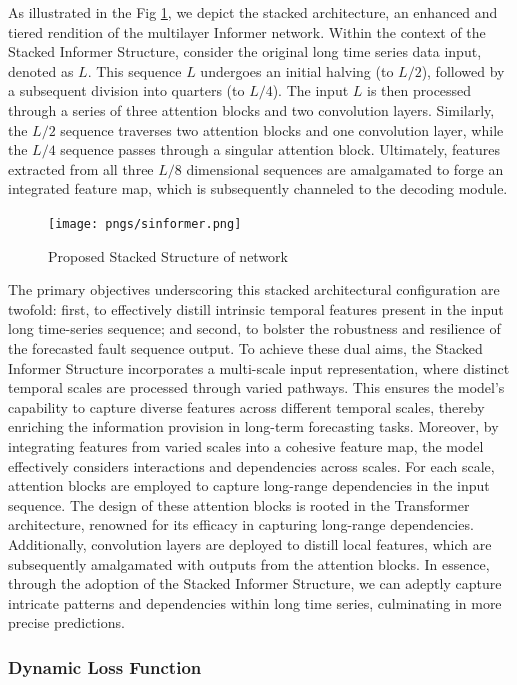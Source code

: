 \documentclass[sn-mathphys,Numbered]{sn-jnl}
\theoremstyle{thmstyleone}%
\theoremstyle{thmstyletwo}%
\theoremstyle{thmstylethree}%
\begin{document}
As illustrated in the Fig \ref{sinformer}, we depict the stacked architecture, an enhanced and tiered rendition of the multilayer Informer network. Within the context of the Stacked Informer Structure, consider the original long time series data input, denoted as \( L \). This sequence \( L \) undergoes an initial halving (to \( L/2 \)), followed by a subsequent division into quarters (to \( L/4 \)). The input \( L \) is then processed through a series of three attention blocks and two convolution layers. Similarly, the \( L/2 \) sequence traverses two attention blocks and one convolution layer, while the \( L/4 \) sequence passes through a singular attention block. Ultimately, features extracted from all three \( L/8 \) dimensional sequences are amalgamated to forge an integrated feature map, which is subsequently channeled to the decoding module.
\begin{figure}[h]
    \centering
    \texttt{[image: pngs/sinformer.png]}
    \caption{ Proposed Stacked Structure of network}
    \label{sinformer}
\end{figure}
The primary objectives underscoring this stacked architectural configuration are twofold: first, to effectively distill intrinsic temporal features present in the input long time-series sequence; and second, to bolster the robustness and resilience of the forecasted fault sequence output. To achieve these dual aims, the Stacked Informer Structure incorporates a multi-scale input representation, where distinct temporal scales are processed through varied pathways. This ensures the model's capability to capture diverse features across different temporal scales, thereby enriching the information provision in long-term forecasting tasks. Moreover, by integrating features from varied scales into a cohesive feature map, the model effectively considers interactions and dependencies across scales. For each scale, attention blocks are employed to capture long-range dependencies in the input sequence. The design of these attention blocks is rooted in the Transformer architecture, renowned for its efficacy in capturing long-range dependencies. Additionally, convolution layers are deployed to distill local features, which are subsequently amalgamated with outputs from the attention blocks. In essence, through the adoption of the Stacked Informer Structure, we can adeptly capture intricate patterns and dependencies within long time series, culminating in more precise predictions.

\subsubsection{Dynamic Loss Function}\label{subsec4}
\end{document}
